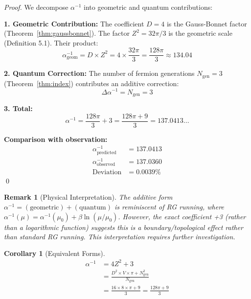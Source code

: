 \documentclass[twocolumn,showpacs,preprintnumbers,amsmath,amssymb,prd]{revtex4-2}
\newtheorem{corollary}[theorem]{Corollary}
\newtheorem{remark}[theorem]{Remark}
\begin{document}
\begin{proof}
We decompose $\alpha^{-1}$ into geometric and quantum contributions:

\textbf{1. Geometric Contribution:}
The coefficient $D = 4$ is the Gauss-Bonnet factor (Theorem~\ref{thm:gaussbonnet}). The factor $Z^2 = 32\pi/3$ is the geometric scale (Definition 5.1). Their product:
\begin{equation}
\alpha^{-1}_{\text{geom}} = D \times Z^2 = 4 \times \frac{32\pi}{3} = \frac{128\pi}{3} \approx 134.04
\end{equation}

\textbf{2. Quantum Correction:}
The number of fermion generations $N_{\text{gen}} = 3$ (Theorem~\ref{thm:index}) contributes an additive correction:
\begin{equation}
\Delta\alpha^{-1} = N_{\text{gen}} = 3
\end{equation}

\textbf{3. Total:}
\begin{equation}
\alpha^{-1} = \frac{128\pi}{3} + 3 = \frac{128\pi + 9}{3} = 137.0413...
\end{equation}

\textbf{Comparison with observation:}
\begin{align}
\alpha^{-1}_{\text{predicted}} &= 137.0413 \nonumber\\
\alpha^{-1}_{\text{observed}} &= 137.0360 \nonumber\\
\text{Deviation} &= 0.0039\%
\end{align}
\qed
\end{proof}

\begin{remark}[Physical Interpretation]
The additive form $\alpha^{-1} = (\text{geometric}) + (\text{quantum})$ is reminiscent of RG running, where $\alpha^{-1}(\mu) = \alpha^{-1}(\mu_0) + \beta \ln(\mu/\mu_0)$. However, the exact coefficient +3 (rather than a logarithmic function) suggests this is a boundary/topological effect rather than standard RG running. This interpretation requires further investigation.
\end{remark}

\begin{corollary}[Equivalent Forms]
\begin{align}
\alpha^{-1} &= 4Z^2 + 3 \\
&= \frac{D^2 \times V \times \pi + N_{\text{gen}}^2}{N_{\text{gen}}} \\
&= \frac{16 \times 8 \times \pi + 9}{3} = \frac{128\pi + 9}{3}
\end{align}
\end{corollary}
\end{document}
